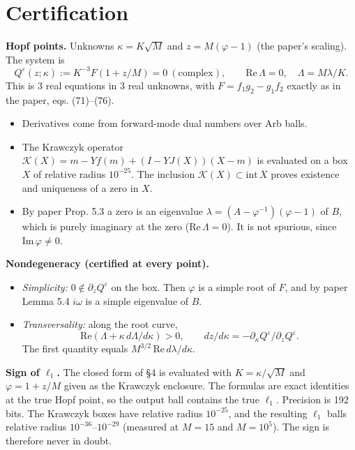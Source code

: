 \documentclass[11pt,a4paper]{report}
\begin{document}
\section{Certification}

\textbf{Hopf points.} Unknowns \(\kappa=K\sqrt M\) and \(z=M(\varphi-1)\) (the paper's scaling). The system is
\[Q^\varepsilon(z;\kappa):=K^{-3}F(1+z/M)=0\ (\text{complex}),\qquad \mathrm{Re}\,\Lambda=0,\quad \Lambda=M\lambda/K .\]
This is 3 real equations in 3 real unknowns, with \(F=f_1g_2-g_1f_2\) exactly as in the paper, eqs. (71)--(76).
\begin{itemize}
\tightlist
\item Derivatives come from forward-mode dual numbers over Arb balls.
\item The Krawczyk operator \(\mathcal K(X)=m-Yf(m)+(I-YJ(X))(X-m)\) is evaluated on a box \(X\) of relative radius
\(10^{-25}\). The inclusion \(\mathcal K(X)\subset\mathrm{int}\,X\) proves existence and uniqueness of a zero in
\(X\).
\item By paper Prop. 5.3 a zero is an eigenvalue \(\lambda=(A-\varphi^{-1})(\varphi-1)\) of \(B\), which is purely
imaginary at the zero (\(\mathrm{Re}\,\Lambda=0\)). It is not spurious, since \(\mathrm{Im}\,\varphi\neq0\).
\end{itemize}

\textbf{Nondegeneracy (certified at every point).}
\begin{itemize}
\tightlist
\item \emph{Simplicity:} \(0\notin\partial_zQ^\varepsilon\) on the box. Then \(\varphi\) is a simple root of \(F\), and by
paper Lemma 5.4 \(i\omega\) is a simple eigenvalue of \(B\).
\item \emph{Transversality:} along the root curve,
\[\mathrm{Re}(\Lambda+\kappa\,d\Lambda/d\kappa)>0,
\qquad dz/d\kappa=-\partial_\kappa Q^\varepsilon/\partial_zQ^\varepsilon.\]
The first quantity equals \(M^{3/2}\,\mathrm{Re}\,d\lambda/d\kappa\).
\end{itemize}

\textbf{Sign of \(\ell_1\).} The closed form of §4 is evaluated with \(K=\kappa/\sqrt M\) and \(\varphi=1+z/M\) given as
the Krawczyk enclosure. The formulas are exact identities at the true Hopf point, so the output ball contains the
true \(\ell_1\). Precision is 192 bits. The Krawczyk boxes have relative radius \(10^{-25}\), and the resulting
\(\ell_1\) balls relative radius \(10^{-36}\)--\(10^{-29}\) (measured at \(M=15\) and \(M=10^5\)). The sign is
therefore never in doubt.
\end{document}
